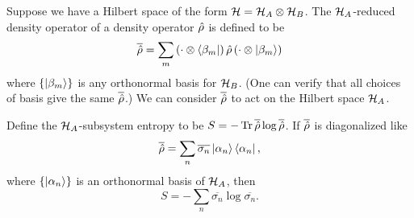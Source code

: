 Suppose we have a Hilbert space of the form \(\mathcal{H} = \mathcal{H}_A \otimes \mathcal{H}_B\). The \(\mathcal{H}_A\)-reduced density operator of a density operator \(\hat{\rho}\) is defined to be
\[\overline{\hat{\rho}} = \sum_m \left(\cdot\otimes\left\langle\beta_m\right|\right) \hat{\rho} \left(\cdot\otimes\left|\beta_m\right\rangle\right)\]
where \(\{\left|\beta_m\right\rangle\}\) is any orthonormal basis for \(\mathcal{H}_B\). (One can verify that all choices of basis give the same \(\overline{\hat{\rho}}\).)
We can consider \(\overline{\hat{\rho}}\) to act on the Hilbert space \(\mathcal{H}_A\).

Define the \(\mathcal{H}_A\)-subsystem entropy to be \(S = -\operatorname{Tr} \overline{\hat{\rho}} \log \overline{\hat{\rho}}\). If \(\overline{\hat{\rho}}\) is diagonalized like
\begin{equation}\label{eq.redrhodef}
\overline{\hat{\rho}} = \sum_n \overline{\sigma_n} \left|\alpha_n\right\rangle\left\langle\alpha_n\right|,
\end{equation}
where \(\{\left|\alpha_n\right\rangle\}\) is an orthonormal basis of \(\mathcal{H}_A\), then
\begin{equation}\label{eq.entropydefinition}
S = -\sum_n \overline{\sigma_n} \log \overline{\sigma_n}.
\end{equation}

